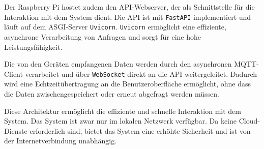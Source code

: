 \documentclass[12pt, letterpaper]{article}
\begin{document}
  \par Der Raspberry Pi hostet zudem den API-Webserver, der als Schnittstelle für die Interaktion mit dem System dient. Die API ist mit \texttt{FastAPI} implementiert und läuft auf dem ASGI-Server \texttt{Uvicorn}. \texttt{Uvicorn} ermöglicht eine effiziente, asynchrone Verarbeitung von Anfragen und sorgt für eine hohe Leistungsfähigkeit.
  \par Die von den Geräten empfangenen Daten werden durch den asynchronen MQTT-Client verarbeitet und über \texttt{WebSocket} direkt an die API weitergeleitet. Dadurch wird eine Echtzeitübertragung an die Benutzeroberfläche ermöglicht, ohne dass die Daten zwischengespeichert oder erneut abgefragt werden müssen.
 
  \par Diese Architektur ermöglicht die effiziente und schnelle Interaktion mit dem System. Das System ist zwar nur im lokalen Netzwerk verfügbar. Da keine Cloud-Dienste erforderlich sind, bietet das System eine erhöhte Sicherheit und ist von der Internetverbindung unabhängig.  
\end{document}
